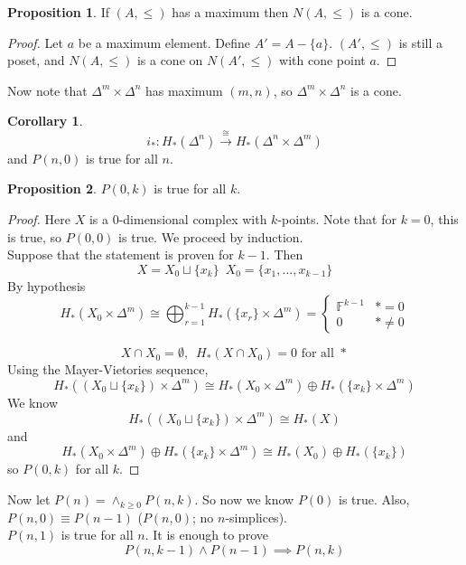 \documentclass[a4paper,14pt]{extarticle}
\theoremstyle{definition}
\newtheorem*{corollary}{Corollary}
\newtheorem*{proposition}{Proposition}
\begin{document}
\begin{proposition}
	If $(A,\leq)$ has a maximum then $N(A,\leq)$ is a cone.
\end{proposition}

\begin{proof}
	Let $a$ be a maximum element. Define $A'=A-\{a\}$. $(A',\leq)$ is still a poset, and 
	$N(A,\leq)$ is a cone on $N(A',\leq)$ with cone point $a$.
\end{proof}

Now note that $\Delta^m\times\Delta^n$ has maximum $(m,n)$, so $\Delta^m\times\Delta^n$ is a 
cone.

\begin{corollary}
	\[i_*:H_*(\Delta^n)\xrightarrow{\cong}H_*(\Delta^n\times\Delta^m)\]
	and $P(n,0)$ is true for all $n$.
\end{corollary}

\begin{proposition}
	$P(0,k)$ is true for all $k$.
\end{proposition}

\begin{proof}
	Here $X$ is a $0$-dimensional complex with $k$-points. Note that for $k=0$, this is
	true, so $P(0,0)$ is true. We proceed by induction. \\

	Suppose that the statement is proven for $k-1$. Then
	\[X=X_0\sqcup\{x_k\}\,\,\,X_0=\{x_1,\ldots,x_{k-1}\}\]
	By hypothesis 
	\[H_*(X_0\times\Delta^m)\cong\bigoplus_{r=1}^{k-1}H_*(\{x_r\}\times\Delta^m)=
	\begin{cases}
		\mathbb{F}^{k-1}&*=0\\0&*\neq0
	\end{cases}\]

	\[X\cap X_0=\emptyset, \,\,\,H_*(X\cap X_0)=0\text{ for all }*\]
	Using the Mayer-Vietories sequence,
	\[H_*((X_0\sqcup\{x_k\})\times\Delta^m)\cong H_*(X_0\times\Delta^m)\oplus H_*(\{x_k\}\times
	\Delta^m)\]
	We know \[H_*((X_0\sqcup\{x_k\})\times\Delta^m)\cong H_*(X)\] and 
	\[H_*(X_0\times\Delta^m)\oplus H_*(\{x_k\}\times
	\Delta^m)\cong H_*(X_0)\oplus H_*(\{x_k\})\] so $P(0,k)$ for all $k$.
\end{proof}

Now let $P(n)=\wedge_{k\geq0} P(n,k)$. So now we know $P(0)$ is true. Also,
$P(n,0)\equiv P(n-1)$ ($P(n,0)$; no $n$-simplices). \\

$P(n,1)$ is true for all $n$. It is enough to prove 
\[P(n,k-1)\wedge P(n-1)\implies P(n,k)\]
\end{document}
